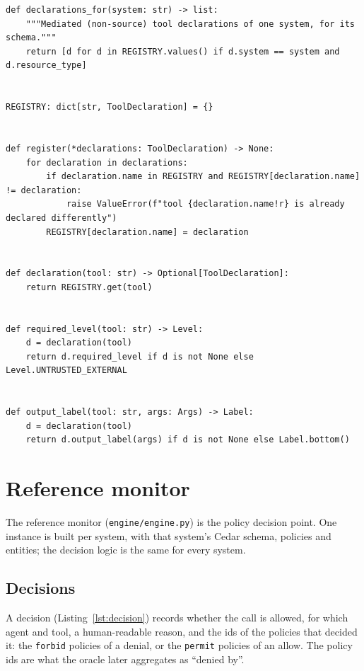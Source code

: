 \documentclass[11pt,a4paper]{article}
\DeclareRobustCommand{\code}[1]{{\renewcommand{\_}{\textunderscore\allowbreak}\texttt{#1}}}
\begin{document}
\begin{lstlisting}[firstnumber=66,style=py,caption={Tool registry and accessors (\texttt{engine/tool\_contract.py}, lines 66--92)},label={lst:registry}]
def declarations_for(system: str) -> list:
    """Mediated (non-source) tool declarations of one system, for its schema."""
    return [d for d in REGISTRY.values() if d.system == system and d.resource_type]


REGISTRY: dict[str, ToolDeclaration] = {}


def register(*declarations: ToolDeclaration) -> None:
    for declaration in declarations:
        if declaration.name in REGISTRY and REGISTRY[declaration.name] != declaration:
            raise ValueError(f"tool {declaration.name!r} is already declared differently")
        REGISTRY[declaration.name] = declaration


def declaration(tool: str) -> Optional[ToolDeclaration]:
    return REGISTRY.get(tool)


def required_level(tool: str) -> Level:
    d = declaration(tool)
    return d.required_level if d is not None else Level.UNTRUSTED_EXTERNAL


def output_label(tool: str, args: Args) -> Label:
    d = declaration(tool)
    return d.output_label(args) if d is not None else Label.bottom()
\end{lstlisting}

\section{Reference monitor}
\label{sec:monitor}

The reference monitor (\code{engine/engine.py}) is the policy decision point. One instance
is built per system, with that system's Cedar schema, policies and entities; the decision
logic is the same for every system.

\subsection{Decisions}

A decision (Listing~\ref{lst:decision}) records whether the call is allowed, for which
agent and tool, a human-readable reason, and the ids of the policies that decided it:
the \code{forbid} policies of a denial, or the \code{permit} policies of an allow. The
policy ids are what the oracle later aggregates as ``denied by''.
\end{document}
